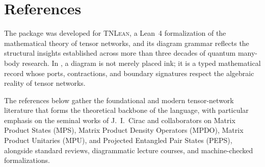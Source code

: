 \section{References}\label{ch:references}

\providecommand{\doi}[1]{\href{https://doi.org/#1}{\nolinkurl{doi:#1}}}
\providecommand{\arxiv}[1]{\href{https://arxiv.org/abs/#1}{\nolinkurl{arXiv:#1}}}

The \pkg{} package was developed for \textsc{TNLean}, a Lean~4 formalization of
the mathematical theory of tensor networks, and its diagram grammar reflects
the structural insights established across more than three decades of
quantum many-body research.  In \pkg{}, a diagram is not merely placed ink;
it is a typed mathematical record whose ports, contractions, and boundary
signatures respect the algebraic reality of tensor networks.

The references below gather the foundational and modern tensor-network literature
that forms the theoretical backbone of the language, with particular emphasis on
the seminal works of J.~I.~Cirac and collaborators on Matrix Product States
(MPS), Matrix Product Density Operators (MPDO), Matrix Product Unitaries (MPU),
and Projected Entangled Pair States (PEPS), alongside standard reviews,
diagrammatic lecture courses, and machine-checked formalizations.

\makeatletter
\renewenvironment{thebibliography}[1]{%
  \begin{small}%
  \list{\@biblabel{\@arabic\c@enumiv}}%
       {\settowidth\labelwidth{\@biblabel{#1}}%
        \leftmargin\labelwidth
        \advance\leftmargin\labelsep
        \itemsep 0.35\baselineskip plus 0.1\baselineskip minus 0.05\baselineskip
        \parsep 0pt
        \usecounter{enumiv}%
        \let\p@enumiv\@empty
        \renewcommand\theenumiv{\@arabic\c@enumiv}}%
  \sloppy
  \clubpenalty4000
  \@clubpenalty \clubpenalty
  \widowpenalty4000%
  \sfcode`\.\@m
}{%
  \def\@noitemerr{\@latex@warning{Empty `thebibliography' environment}}%
  \endlist
  \end{small}%
}
\makeatother

